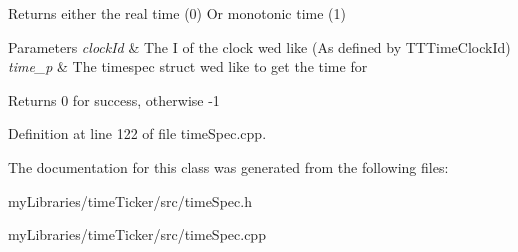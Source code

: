 Returns either the real time (0) Or monotonic time (1) 


\begin{DoxyParams}{Parameters}
{\em clock\+Id} & The I of the clock we\textquotesingle{}d like (As defined by T\+T\+Time\+Clock\+Id) \\
\hline
{\em time\+\_\+p} & The timespec struct we\textquotesingle{}d like to get the time for \\
\hline
\end{DoxyParams}
\begin{DoxyReturn}{Returns}
0 for success, otherwise -\/1 
\end{DoxyReturn}


Definition at line 122 of file time\+Spec.\+cpp.



The documentation for this class was generated from the following files\+:\begin{DoxyCompactItemize}
\item 
my\+Libraries/time\+Ticker/src/time\+Spec.\+h\item 
my\+Libraries/time\+Ticker/src/time\+Spec.\+cpp\end{DoxyCompactItemize}
